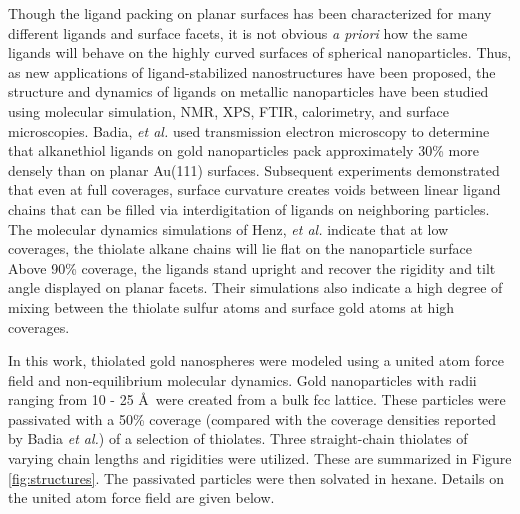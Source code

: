 Though the ligand packing on planar surfaces has been characterized
for many different ligands and surface facets, it is not obvious
\emph{a priori} how the same ligands will behave on the highly curved
surfaces of spherical nanoparticles. Thus, as new applications of
ligand-stabilized nanostructures have been proposed, the structure and
dynamics of ligands on metallic nanoparticles have been studied using
molecular simulation,\cite{Henz:2008qf} NMR, XPS, FTIR,
calorimetry, and surface
microscopies.\cite{Badia1996:2,Badia1996,Badia1997:2,Badia1997,Badia2000}
Badia, \textit{et al.} used transmission electron microscopy to
determine that alkanethiol ligands on gold nanoparticles pack
approximately 30\% more densely than on planar Au(111)
surfaces.\cite{Badia1996:2} Subsequent experiments demonstrated that
even at full coverages, surface curvature creates voids between linear
ligand chains that can be filled via interdigitation of ligands on
neighboring particles.\cite{Badia1996} The molecular dynamics
simulations of Henz, \textit{et al.} indicate that at low coverages,
the thiolate alkane chains will lie flat on the nanoparticle
surface\cite{Henz:2008qf} Above 90\% coverage, the ligands
stand upright and recover the rigidity and tilt angle displayed on
planar facets. Their simulations also indicate a high degree of mixing
between the thiolate sulfur atoms and surface gold atoms at high
coverages.

In this work, thiolated gold nanospheres were modeled using a united
atom force field and non-equilibrium molecular dynamics. Gold
nanoparticles with radii ranging from 10 - 25 \AA\ were created from a
bulk fcc lattice.  These particles were passivated with a 50\%
coverage (compared with the coverage densities reported by Badia
\textit{et al.}) of a selection of thiolates.  Three straight-chain
thiolates of varying chain lengths and rigidities were utilized.
These are summarized in Figure \ref{fig:structures}.  The passivated
particles were then solvated in hexane.  Details on the united atom
force field are given below.

